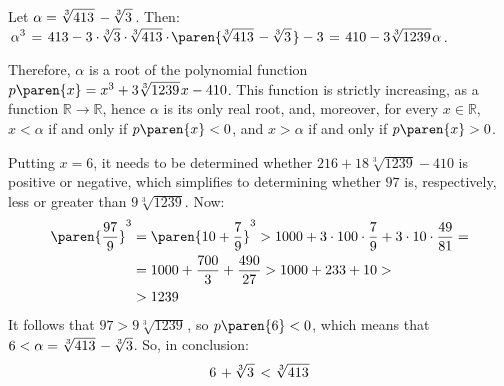Let $\displaystyle{\alpha = \sqrt[3]{413 \mspace{1mu}} \mspace{2mu} - \mspace{-1mu} \sqrt[3]{3 \mspace{1mu}} \mspace{1mu}}$.
Then:
$\displaystyle{ \mspace{2mu}
  \alpha^3 \mspace{2mu}
  = \mspace{2mu} 413 - 3 \cdot \mspace{-2mu} \sqrt[3]{3} \cdot \mspace{-2mu} \sqrt[3]{413} \cdot \mspace{-2mu} \paren{\mspace{-2mu} \sqrt[3]{413} \mspace{2mu} - \mspace{-1mu} \sqrt[3]{3 \mspace{1mu}} \mspace{1mu}} - 3 \mspace{2mu}
  = \mspace{2mu} 410 - 3 \sqrt[3]{1239 \mspace{1mu}} \mspace{1mu} \alpha
\mspace{1mu}}$.

Therefore, $\alpha$ is a root of the polynomial function
$p\paren{x} = x^3 + 3 \sqrt[3]{1239 \mspace{1mu}} \mspace{1mu} x - 410$.
This function is strictly increasing, as a function $\mathbb{R} \to \mathbb{R}$, hence $\alpha$ is its only real root,
and, moreover, for every $x \in \mathbb{R}$,
$x < \alpha$ if and only if $p\paren{x} < 0$,
and $x > \alpha$ if and only if $p\paren{x} > 0$.

Putting $x = 6$, it needs to be determined whether $216 + 18 \sqrt[3]{1239} - 410$ is positive or negative,
which simplifies to determining whether $97$ is, respectively, less or greater than $9 \sqrt[3]{1239}$.
Now:
\begin{align*}
  \paren{\frac{97}{9}}^3
  &= \paren{10 + \frac{7}{9}}^3
   > 1000 + 3 \cdot 100 \cdot \frac{7}{9} + 3 \cdot 10 \cdot \frac{49}{81} = \\
  &= 1000 + \frac{700}{3} + \frac{490}{27}
   > 1000 + 233 + 10 > \\
  &> 1239
\end{align*}
It follows that $97 > 9 \sqrt[3]{1239 \mspace{1mu}} \mspace{1mu}$, so $p\paren{6} < 0$,
which means that $6 < \alpha = \sqrt[3]{413} \mspace{2mu} - \mspace{-1mu} \sqrt[3]{3}$.
So, in conclusion:
\begin{equation*}
  6 \mspace{2mu} + \mspace{-1mu} \sqrt[3]{3 \mspace{1mu}} \mspace{2mu}
  <
  \sqrt[3]{413 \mspace{1mu}}
\end{equation*}
